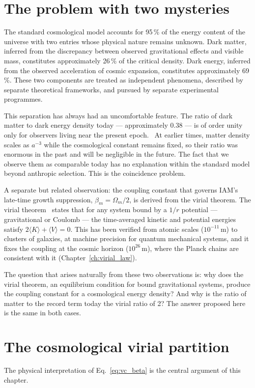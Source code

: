 \section{The problem with two mysteries}\label{sec:vp_problem}
The standard cosmological model accounts for 95\,\% of the energy content of the universe with two entries whose physical nature remains unknown. Dark
matter, inferred from the discrepancy between observed gravitational effects and visible mass, constitutes approximately 26\,\% of the critical density.
Dark energy, inferred from the observed acceleration of cosmic expansion, constitutes approximately 69\,\%. These two components are treated as independent
phenomena, described by separate theoretical frameworks, and pursued by separate experimental programmes. \observed

This separation has always had an uncomfortable feature. The ratio of dark matter to dark energy density today --- approximately 0.38 --- is of order
unity only for observers living near the present epoch. \calc\ At earlier times, matter density scales as $a^{-3}$ while the cosmological constant
remains fixed, so their ratio was enormous in the past and will be negligible in the future. The fact that we observe them as comparable today has no
explanation within the standard model beyond anthropic selection. This is the coincidence problem.

A separate but related observation: the coupling constant that governs IAM's late-time growth suppression, $\beta_m=\Omega_m/2$, is derived from the virial
theorem. The virial theorem~\cite{Clausius1870} states that for any system bound by a $1/r$ potential --- gravitational or Coulomb --- the time-averaged kinetic and potential
energies satisfy $2\langle K\rangle+\langle V\rangle=0$. This has been verified from atomic scales ($10^{-11}$\,m) to clusters of galaxies, at machine
precision for quantum mechanical systems, and it fixes the coupling at the cosmic horizon ($10^{26}$\,m), where the Planck chains are consistent with it
(Chapter~\ref{ch:virial_law}). \observed{} \measured

The question that arises naturally from these two observations is: why does the virial theorem, an equilibrium condition for bound gravitational systems,
produce the coupling constant for a cosmological energy density? And why is the ratio of matter to the record term today the virial ratio of 2? The
answer proposed here is the same in both cases.

\section{The cosmological virial partition}\label{sec:vp_partition}
The physical interpretation of Eq.~\eqref{eq:vc_beta} is the central argument of this chapter. \conjecture

